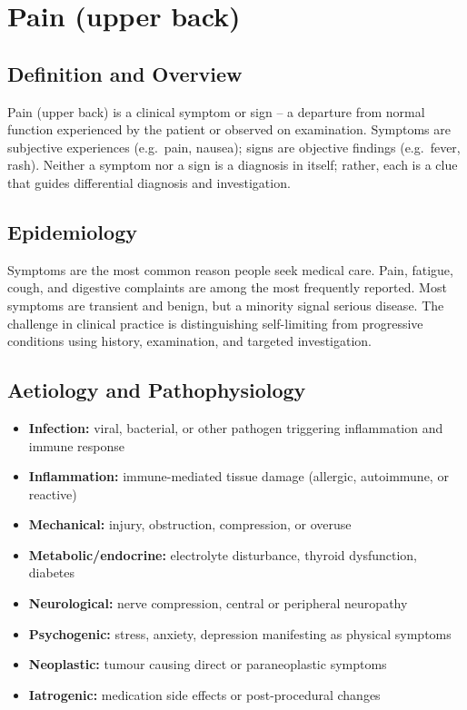 \chapter{Pain (upper back)}

\section*{Definition and Overview}
Pain (upper back) is a clinical symptom or sign -- a departure from normal function experienced by the patient or observed on examination. Symptoms are subjective experiences (e.g.\ pain, nausea); signs are objective findings (e.g.\ fever, rash). Neither a symptom nor a sign is a diagnosis in itself; rather, each is a clue that guides differential diagnosis and investigation.

\section*{Epidemiology}
Symptoms are the most common reason people seek medical care. Pain, fatigue, cough, and digestive complaints are among the most frequently reported. Most symptoms are transient and benign, but a minority signal serious disease. The challenge in clinical practice is distinguishing self-limiting from progressive conditions using history, examination, and targeted investigation.

\section*{Aetiology and Pathophysiology}
\begin{itemize}
    \item \textbf{Infection:} viral, bacterial, or other pathogen triggering inflammation and immune response
    \item \textbf{Inflammation:} immune-mediated tissue damage (allergic, autoimmune, or reactive)
    \item \textbf{Mechanical:} injury, obstruction, compression, or overuse
    \item \textbf{Metabolic/endocrine:} electrolyte disturbance, thyroid dysfunction, diabetes
    \item \textbf{Neurological:} nerve compression, central or peripheral neuropathy
    \item \textbf{Psychogenic:} stress, anxiety, depression manifesting as physical symptoms
    \item \textbf{Neoplastic:} tumour causing direct or paraneoplastic symptoms
    \item \textbf{Iatrogenic:} medication side effects or post-procedural changes
\end{itemize}

